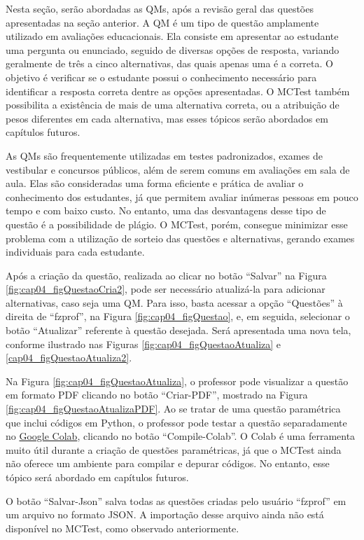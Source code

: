 Nesta seção, serão abordadas as QMs, após a revisão geral das questões apresentadas na seção anterior. A QM é um tipo de questão amplamente utilizado em avaliações educacionais. Ela consiste em apresentar ao estudante uma pergunta ou enunciado, seguido de diversas opções de resposta, variando geralmente de três a cinco alternativas, das quais apenas uma é a correta. O objetivo é verificar se o estudante possui o conhecimento necessário para identificar a resposta correta dentre as opções apresentadas. O MCTest também possibilita a existência de mais de uma alternativa correta, ou a atribuição de pesos diferentes em cada alternativa, mas esses tópicos serão abordados em capítulos futuros.

As QMs são frequentemente utilizadas em testes padronizados, exames de vestibular e concursos públicos, além de serem comuns em avaliações em sala de aula. Elas são consideradas uma forma eficiente e prática de avaliar o conhecimento dos estudantes, já que permitem avaliar inúmeras pessoas em pouco tempo e com baixo custo. No entanto, uma das desvantagens desse tipo de questão é a possibilidade de plágio. O MCTest, porém, consegue minimizar esse problema com a utilização de sorteio das questões e alternativas, gerando exames individuais para cada estudante.

Após a criação da questão, realizada ao clicar no botão ``Salvar'' na Figura \ref{fig:cap04_figQuestaoCria2}, pode ser necessário atualizá-la para adicionar alternativas, caso seja uma QM. Para isso, basta acessar a opção ``Questões'' à direita de ``fzprof'', na Figura \ref{fig:cap04_figQuestao}, e, em seguida, selecionar o botão ``Atualizar'' referente à questão desejada. Será apresentada uma nova tela, conforme ilustrado nas Figuras \ref{fig:cap04_figQuestaoAtualiza} e \ref{cap04_figQuestaoAtualiza2}.

Na Figura \ref{fig:cap04_figQuestaoAtualiza}, o professor pode visualizar a questão em formato PDF clicando no botão ``Criar-PDF'', mostrado na Figura \ref{fig:cap04_figQuestaoAtualizaPDF}. Ao se tratar de uma questão paramétrica que inclui códigos em Python, o professor pode testar a questão separadamente no \href{https://colab.research.google.com/}{Google Colab}, clicando no botão ``Compile-Colab''. O Colab é uma ferramenta muito útil durante a criação de questões paramétricas, já que o MCTest ainda não oferece um ambiente para compilar e depurar códigos. No entanto, esse tópico será abordado em capítulos futuros.

O botão ``Salvar-Json'' salva todas as questões criadas pelo usuário ``fzprof'' em um arquivo no formato JSON. A importação desse arquivo ainda não está disponível no MCTest, como observado anteriormente. 

